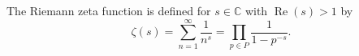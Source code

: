 The Riemann zeta function is defined for $s \in \mathbb{C}$ with $\operatorname{Re}(s) > 1$ by
$$\zeta(s) = \sum_{n=1}^{\infty} \frac{1}{n^s} = \prod_{p \in P} \frac{1}{1-p^{-s}}.$$
